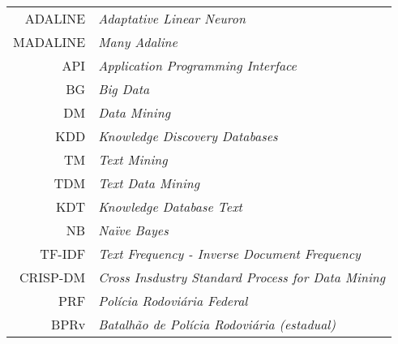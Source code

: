 \vspace*{12pt}

\noindent

\vspace{1em}

\begin{tabular}{r  l}
 ADALINE & \textit{Adaptative Linear Neuron}\\
 MADALINE & \textit{Many Adaline}\\
 API & \textit{Application Programming Interface}\\
 BG & \textit{Big Data}\\
 DM & \textit{Data Mining}\\
 KDD & \textit{Knowledge Discovery Databases}\\
 TM & \textit{Text Mining} \\
 TDM & \textit{Text Data Mining}\\
 KDT & \textit{Knowledge Database Text}\\
 NB & \textit{Naïve Bayes}\\ 
 TF-IDF & \textit{Text Frequency - Inverse Document Frequency} \\
 CRISP-DM & \textit{Cross Insdustry Standard Process for Data Mining}\\
 PRF & \textit{Polícia Rodoviária Federal}\\
 BPRv & \textit{Batalhão de Polícia Rodoviária (estadual)}\\


 
\end{tabular}


